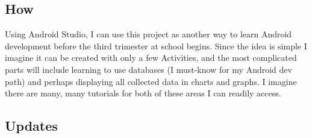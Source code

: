 \documentclass{article}[2017/07/09]
\begin{document}
    \subsection{How}
      Using Android Studio, I can use this project as another way to learn Android development before the third trimester at school begins. Since the idea is simple I imagine it can be created with only a few Activities, and the most complicated parts will include learning to use databases (I must-know for my Android dev path) and perhaps displaying all collected data in charts and graphs. I imagine there are many, many tutorials for both of these areas I can readily access.
    \subsection{Updates}
    
 
\end{document}
